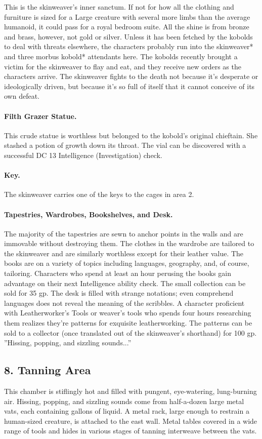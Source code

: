 \documentclass[10pt,a4paper,twoside,twocolumn,openany,bg=print,nodeprecatedcode]{dndbook}
\begin{document}
This is the skinweaver's inner sanctum. If not for how all the clothing and furniture is sized for a Large creature with several more limbs than the average humanoid, it could pass for a royal bedroom suite. All the shine is from bronze and brass, however, not gold or silver. Unless it has been fetched by the kobolds to deal with threats elsewhere, the characters probably run into the skinweaver* and three morbus kobold* attendants here. The kobolds recently brought a victim for the skinweaver to flay and eat, and they receive new orders as the characters arrive.
The skinweaver fights to the death not because it's desperate or ideologically driven, but because it's so full of itself that it cannot conceive of its own defeat.
\paragraph{Filth Grazer Statue.}
This crude statue is worthless but belonged to the kobold's original chieftain. She stashed a potion of growth down its throat. The vial can be discovered with a successful DC 13 Intelligence (Investigation) check.
\paragraph{Key.}
The skinweaver carries one of the keys to the cages in area 2.
\paragraph{Tapestries, Wardrobes, Bookshelves, and Desk.}
The majority of the tapestries are sewn to anchor points in the walls and are immovable without destroying them. The clothes in the wardrobe are tailored to the skinweaver and are similarly worthless except for their leather value. The books are on a variety of topics including languages, geography, and, of course, tailoring. Characters who spend at least an hour perusing the books gain advantage on their next Intelligence ability check. The small collection can be sold for 35 gp. The desk is filled with strange notations; even comprehend languages does not reveal the meaning of the scribbles. A character proficient with Leatherworker's Tools or weaver's tools who spends four hours researching them realizes they're patterns for exquisite leatherworking. The patterns can be sold to a collector (once translated out of the skinweaver's shorthand) for 100 gp.
\DndQuote%
{}
{''Hissing, popping, and sizzling sounds...''}
{}
\subsection{8. Tanning Area}
\begin{DndReadAloud}{}
This chamber is stiflingly hot and filled with pungent, eye-watering, lung-burning air. Hissing, popping, and sizzling sounds come from half-a-dozen large metal vats, each containing gallons of liquid. A metal rack, large enough to restrain a human-sized creature, is attached to the east wall. Metal tables covered in a wide range of tools and hides in various stages of tanning interweave between the vats.
\end{DndReadAloud}
\end{document}

